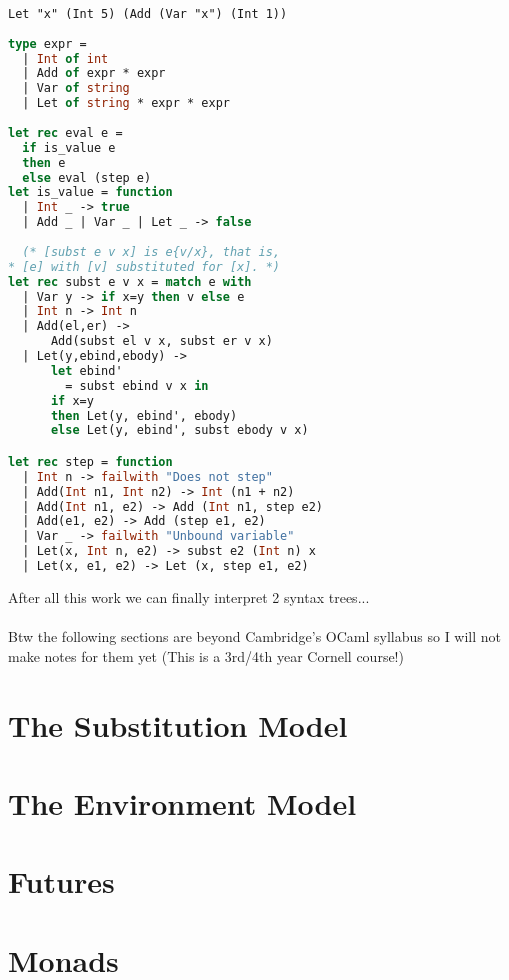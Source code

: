 \documentclass[12pt,a4paper]{article} %
\begin{document}
\verb|Let "x" (Int 5) (Add (Var "x") (Int 1))|
\begin{lstlisting}[language=Caml]
type expr =
  | Int of int
  | Add of expr * expr
  | Var of string
  | Let of string * expr * expr
           
let rec eval e =
  if is_value e
  then e
  else eval (step e)
let is_value = function
  | Int _ -> true
  | Add _ | Var _ | Let _ -> false
    
  (* [subst e v x] is e{v/x}, that is,
* [e] with [v] substituted for [x]. *)
let rec subst e v x = match e with
  | Var y -> if x=y then v else e
  | Int n -> Int n
  | Add(el,er) ->
      Add(subst el v x, subst er v x)
  | Let(y,ebind,ebody) ->
      let ebind'
        = subst ebind v x in
      if x=y
      then Let(y, ebind', ebody)
      else Let(y, ebind', subst ebody v x)

let rec step = function
  | Int n -> failwith "Does not step"
  | Add(Int n1, Int n2) -> Int (n1 + n2)
  | Add(Int n1, e2) -> Add (Int n1, step e2)
  | Add(e1, e2) -> Add (step e1, e2)
  | Var _ -> failwith "Unbound variable"
  | Let(x, Int n, e2) -> subst e2 (Int n) x
  | Let(x, e1, e2) -> Let (x, step e1, e2)
  \end{lstlisting}
 After all this work we can finally interpret 2 syntax trees...
 \\\\
 Btw the following sections are beyond Cambridge's OCaml syllabus so I will not make notes for them yet (This is a 3rd/4th year Cornell course!)
 \section{The Substitution Model}
 \section{The Environment Model}
 \section{Futures}
 \section{Monads}
\end{document}
